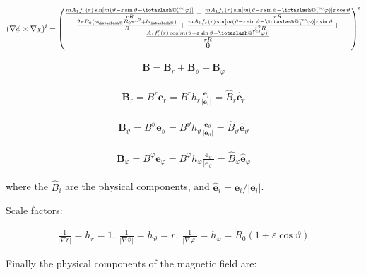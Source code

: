 \documentclass[11pt,a4paper,oneside]{article}
\makeatletter
\newcommand{\iotaslash}{{\mathpalette\iotaslash@\relax}}
\newcommand{\iotaslash@}[2]{
  \raisebox{-0.6\height}[0pt][0pt]{%
    \rotatebox[origin=Bl]{15}{$\m@th#1{\mkern-1mu\mathchar'26}$}%
  }%
  \mkern-9.5mu\nonscript\mkern-1mu
  \iota
  \mkern1mu
}
\makeatother
\begin{document}
\begin{align}
(\nabla \phi \times \nabla \chi)^i =\begin{pmatrix}\frac{mA_1f_r(r)\sin[m(\vartheta-\varepsilon \sin{\vartheta}-\iotaslash^{res}_1\varphi)]}{rR}-\frac{mA_1f_r(r)\sin[m(\vartheta-\varepsilon \sin{\vartheta}-\iotaslash^{res}_1\varphi)]\varepsilon\cos{\vartheta}}{rR}\\\frac{2\pi B_0(a_\iotaslash B_0 \pi r^2+b_\iotaslash)}{R}+\frac{mA_1f_r(r)\sin[m(\vartheta-\varepsilon \sin{\vartheta}-\iotaslash^{res}_1\varphi)]\varepsilon \sin{\vartheta}}{r^2R}+\\
\frac{A_1f_r'(r)\cos[m(\vartheta-\varepsilon \sin{\vartheta}-\iotaslash^{res}_1\varphi)]}{rR}\\0\end{pmatrix}^i
\end{align}

\begin{align}
\mathbf{B}=\mathbf{B}_{r}+\mathbf{B}_{\vartheta}+\mathbf{B}_{\varphi}
\end{align}

\begin{align}
\mathbf{B}_{r}=B^r\mathbf{e}_{r}=B^r h_r \frac{\mathbf{e}_{r}}{|\mathbf{e}_{r}|}=\hat{B}_{r}\mathbf{\hat{e}}_{r}
\end{align}

\begin{align}
\mathbf{B}_{\vartheta}=B^\vartheta\mathbf{e}_{\vartheta}=B^\vartheta h_\vartheta \frac{\mathbf{e}_{\vartheta}}{|\mathbf{e}_{\vartheta}|}=\hat{B}_{\vartheta}\mathbf{\hat{e}}_{\vartheta}
\end{align}

\begin{align}
\mathbf{B}_{\varphi}=B^\varphi\mathbf{e}_{\varphi}=B^\varphi h_\varphi \frac{\mathbf{e}_{\vartheta}}{|\mathbf{e}_{\vartheta}|}=\hat{B}_{\varphi}\mathbf{\hat{e}}_{\varphi}
\end{align}

where the $\hat{B}_{i}$ are the physical components, and $\mathbf{\hat{e}}_{i}=\mathbf{e}_{i}/{|\mathbf{e}_{i}|}$.

Scale factors:

\begin{align}
\frac{1}{|\nabla r|}=h_r=1,\ \frac{1}{|\nabla \vartheta|}=h_{\vartheta}=r,\ \frac{1}{|\nabla \varphi|}=h_{\varphi}=R_0(1+\varepsilon \cos{\vartheta})
\end{align}

Finally the physical components of the magnetic field are:
\end{document}
